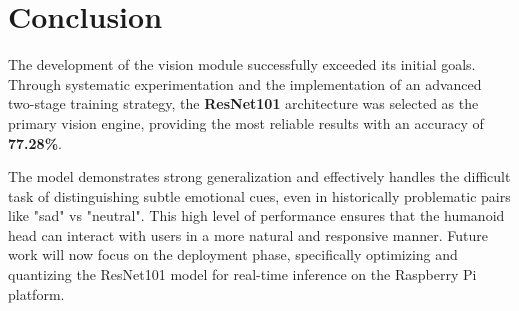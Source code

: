 \documentclass{article}
\begin{document}
\section{Conclusion}
The development of the vision module successfully exceeded its initial goals. Through systematic experimentation and the implementation of an advanced two-stage training strategy, the \textbf{ResNet101} architecture was selected as the primary vision engine, providing the most reliable results with an accuracy of \textbf{77.28\%}. 

The model demonstrates strong generalization and effectively handles the difficult task of distinguishing subtle emotional cues, even in historically problematic pairs like "sad" vs "neutral". This high level of performance ensures that the humanoid head can interact with users in a more natural and responsive manner. Future work will now focus on the deployment phase, specifically optimizing and quantizing the ResNet101 model for real-time inference on the Raspberry Pi platform.
\end{document}
